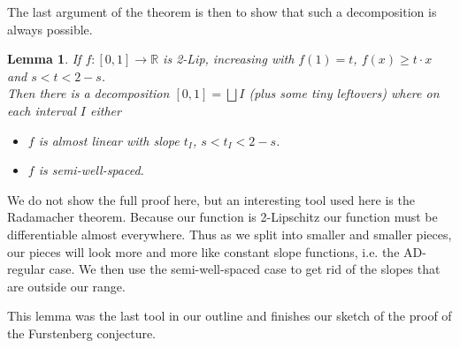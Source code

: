 \documentclass[12pt]{amsart}
\newtheorem{lemma}[theorem]{Lemma}
\newcommand{\RR}{\mathbb{R}}
\begin{document}
The last argument of the theorem is then to show that such a decomposition is always possible.
\begin{lemma}
  If $f : [0,1] \to \RR$ is 2-Lip, increasing with $f(1) = t$, $f(x) \geq t \cdot x$ and $s < t < 2 - s$.\\
  Then there is a decomposition $[0,1] = \bigsqcup I$ (plus some tiny leftovers) where on each interval $I$ either
  \begin{itemize}
    \item $f$ is almost linear with slope $t_I$, $s < t_I < 2 - s$.
    \item $f$ is semi-well-spaced.
  \end{itemize}
\end{lemma}
We do not show the full proof here, but an interesting tool used here is the Radamacher theorem. Because our function is 2-Lipschitz our function must be differentiable almost everywhere. Thus as we split into smaller and smaller pieces, our pieces will look more and more like constant slope functions, i.e. the AD-regular case. We then use the semi-well-spaced case to get rid of the slopes that are outside our range.

This lemma was the last tool in our outline and finishes our sketch of the proof of the Furstenberg conjecture.
\end{document}
